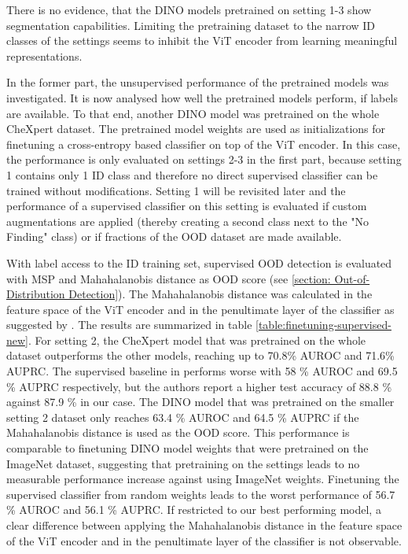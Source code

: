 There is no evidence, that the DINO models pretrained on setting 1-3 show segmentation capabilities.
Limiting the pretraining dataset to the narrow ID classes of the settings seems to inhibit the ViT encoder from learning meaningful representations.
\par
In the former part, the unsupervised performance of the pretrained models was investigated.
It is now analysed how well the pretrained models perform, if labels are available.
To that end, another DINO model was pretrained on the whole CheXpert dataset.
The pretrained model weights are used as initializations for finetuning a cross-entropy based classifier on top of the ViT encoder.
In this case, the performance is only evaluated on settings 2-3 in the first part, because setting 1 contains only 1 ID class and therefore no direct supervised classifier can be trained without modifications.
Setting 1 will be revisited later and the performance of a supervised classifier on this setting is evaluated if custom augmentations are applied (thereby creating a second class next to the "No Finding" class) or if fractions of the OOD dataset are made available.
\par
With label access to the ID training set, supervised OOD detection is evaluated with MSP and Mahahalanobis distance as OOD score (see \ref{section: Out-of-Distribution Detection}).
The Mahahalanobis distance was calculated in the feature space of the ViT encoder and in the penultimate layer of the classifier as suggested by \citep{Lee2018, Michels2023}.
The results are summarized in table \ref{table:finetuning-supervised-new}.
For setting 2, the CheXpert model that was pretrained on the whole dataset outperforms the other models, reaching up to 70.8\% AUROC and 71.6\% AUPRC.
The supervised baseline in \citep{Berger2021} performs worse with 58 \% AUROC and 69.5 \% AUPRC respectively, but the authors report a higher test accuracy of 88.8 \% against 87.9 \% in our case.
The DINO model that was pretrained on the smaller setting 2 dataset only reaches 63.4 \% AUROC and 64.5 \% AUPRC if the Mahahalanobis distance is used as the OOD score.
This performance is comparable to finetuning DINO model weights that were pretrained on the ImageNet dataset, suggesting that pretraining on the settings leads to no measurable performance increase against using ImageNet weights.
Finetuning the supervised classifier from random weights leads to the worst performance of 56.7 \% AUROC and 56.1 \% AUPRC.
If restricted to our best performing model, a clear difference between applying the Mahahalanobis distance in the feature space of the ViT encoder and in the penultimate layer of the classifier is not observable.
